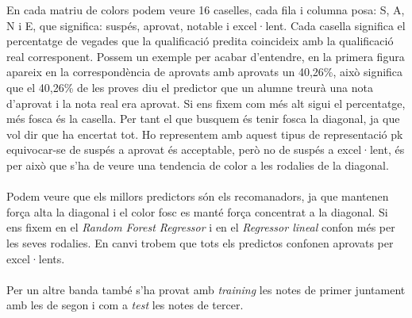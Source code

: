 \documentclass[12pt,a4paper,catalan]{article}
\begin{document}
En cada matriu de colors podem veure 16 caselles, cada fila i columna posa: S, A, N i E, que significa: suspés, aprovat, notable i excel·lent. Cada casella significa el percentatge de vegades que la qualificació predita coincideix amb la qualificació real corresponent. Possem un exemple per acabar d'entendre, en la primera figura apareix en la correspondència de aprovats amb aprovats un 40,26\%, això significa que el 40,26\% de les proves diu el predictor que un alumne treurà una nota d'aprovat i la nota real era aprovat. Si ens fixem com més alt sigui el percentatge, més fosca és la casella. Per tant el que busquem és tenir fosca la diagonal, ja que vol dir que ha encertat tot. Ho representem amb aquest tipus de representació pk equivocar-se de suspés a aprovat és acceptable, però no de suspés a excel·lent, és per això que s'ha de veure una tendencia de color a les rodalies de la diagonal.
\\
\\
Podem veure que els millors predictors són els recomanadors, ja que mantenen força alta la diagonal i el color fosc es manté força concentrat a la diagonal. Si ens fixem en el \textit{Random Forest Regressor} i en el \textit{Regressor lineal} confon més per les seves rodalies. En canvi trobem que tots els predictos confonen aprovats per excel·lents.
\\
\\
Per un altre banda també s'ha provat amb \textit{training} les notes de primer juntament amb les de segon i com a \textit{test} les notes de tercer.
\end{document}
